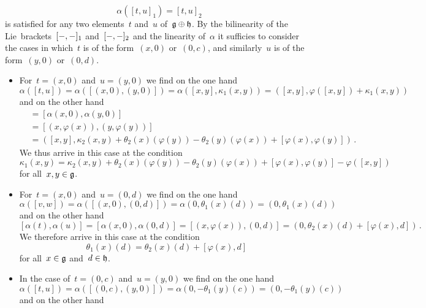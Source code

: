 \begin{fluff}
\begin{enumerate}[resume*]
			\[
				\alpha( [ t, u ]_1 )
				=
				[ t, u ]_2
			\]
			is satisfied for any two elements~$t$ and~$u$ of~$\mathfrak{g} \oplus \mathfrak{h}$.
			By the bilinearity of the Lie~brackets~$[-, -]_1$ and~$[-, -]_2$ and the linearity of~$\alpha$ it sufficies to consider the cases in which~$t$ is of the form~$(x,0)$ or~$(0,c)$, and similarly~$u$ is of the form~$(y,0)$ or~$(0,d)$.
			\begin{itemize}
				\item
					For~$t = (x,0)$ and~$u = (y,0)$ we find on the one hand
					\[
						\alpha( [t,u] )
						=
						\alpha( [ (x,0) , (y,0) ] )
						=
						\alpha( [x,y], \kappa_1(x,y) )
						=
						( [x,y], \varphi( [x,y] ) + \kappa_1(x,y) )
					\]
					and on the other hand
					\begin{align*}
						[ \alpha(t), \alpha(u) ]
						&=
						[ \alpha(x,0), \alpha(y,0) ]
						\\
						&=
						[ (x, \varphi(x)), (y, \varphi(y)) ]
						\\
						&=
						( [x,y], \kappa_2(x,y) + \theta_2(x)(\varphi(y)) - \theta_2(y)(\varphi(x)) + [\varphi(x), \varphi(y)] ) \,.
					\end{align*}
					We thus arrive in this case at the condition
					\[
						\kappa_1(x,y)
						=
						\kappa_2(x,y)
						+ \theta_2(x)(\varphi(y))
						- \theta_2(y)(\varphi(x))
						+ [\varphi(x), \varphi(y)]
						- \varphi( [x,y] )
					\]
					for all~$x, y \in \mathfrak{g}$.
				\item
					For~$t = (x,0)$ and~$u = (0,d)$ we find on the one hand
					\[
						\alpha( [v,w] )
						=
						\alpha( [ (x,0), (0,d) ] )
						=
						\alpha( 0, \theta_1(x)(d) )
						=
						(0, \theta_1(x)(d))
					\]
					and on the other hand
					\[
						[ \alpha(t), \alpha(u) ]
						=
						[ \alpha(x,0), \alpha(0,d) ]
						=
						[ (x, \varphi(x)), (0,d) ]
						=
						( 0, \theta_2(x)(d) + [\varphi(x), d] ) \,.
					\]
					We therefore arrive in this case at the condition
					\begin{equation}
						\label{first occurance of condition}
						\theta_1(x)(d)
						=
						\theta_2(x)(d)
						+ [\varphi(x), d]
					\end{equation}
					for all~$x \in \mathfrak{g}$ and~$d \in \mathfrak{h}$.
				\item
					In the case of~$t = (0,c)$ and~$u = (y,0)$ we find on the one hand
					\[
						\alpha( [t,u] )
						=
						\alpha( [ (0,c), (y,0) ] )
						=
						\alpha( 0, -\theta_1(y)(c) )
						=
						( 0, -\theta_1(y)(c) )
					\]
					and on the other hand

\end{itemize}
\end{enumerate}
\end{fluff}
